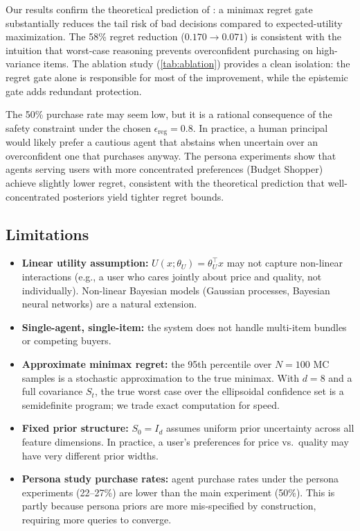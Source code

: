 \documentclass[11pt,letterpaper]{article}
\newcommand{\thetaU}{\theta_U}
\newcommand{\epsreg}{\epsilon_{\mathrm{reg}}}
\begin{document}
Our results confirm the theoretical prediction of \citet{rigter2020minimax}: a minimax regret gate substantially reduces the tail risk of bad decisions compared to expected-utility maximization.  The 58\% regret reduction ($0.170 \to 0.071$) is consistent with the intuition that worst-case reasoning prevents overconfident purchasing on high-variance items.  The ablation study (\cref{tab:ablation}) provides a clean isolation: the regret gate alone is responsible for most of the improvement, while the epistemic gate adds redundant protection.

The 50\% purchase rate may seem low, but it is a rational consequence of the safety constraint under the chosen $\epsreg = 0.8$.  In practice, a human principal would likely prefer a cautious agent that abstains when uncertain over an overconfident one that purchases anyway.  The persona experiments show that agents serving users with more concentrated preferences (Budget Shopper) achieve slightly lower regret, consistent with the theoretical prediction that well-concentrated posteriors yield tighter regret bounds.

\subsection{Limitations}

\begin{itemize}[nosep]
    \item \textbf{Linear utility assumption:} $U(x;\thetaU) = \thetaU^\top x$ may not capture non-linear interactions (e.g., a user who cares jointly about price and quality, not individually).  Non-linear Bayesian models (Gaussian processes, Bayesian neural networks) are a natural extension.
    \item \textbf{Single-agent, single-item:} the system does not handle multi-item bundles or competing buyers.
    \item \textbf{Approximate minimax regret:} the 95th percentile over $N=100$ MC samples is a stochastic approximation to the true minimax.  With $d = 8$ and a full covariance $S_t$, the true worst case over the ellipsoidal confidence set is a semidefinite program; we trade exact computation for speed.
    \item \textbf{Fixed prior structure:} $S_0 = I_d$ assumes uniform prior uncertainty across all feature dimensions.  In practice, a user's preferences for price vs.\ quality may have very different prior widths.
    \item \textbf{Persona study purchase rates:} agent purchase rates under the persona experiments (22--27\%) are lower than the main experiment (50\%).  This is partly because persona priors are more mis-specified by construction, requiring more queries to converge.
\end{itemize}
\end{document}

